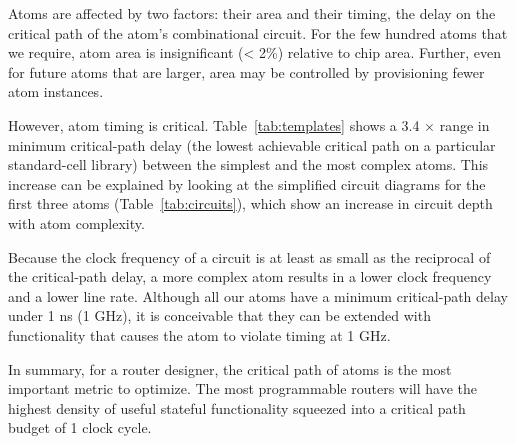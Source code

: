  Atoms are affected by
two factors: their area and their timing, \ie the delay on the critical path of
the atom's combinational circuit. For the few hundred atoms that we require,
atom area is insignificant (< 2\%) relative to chip area.  Further, even for
future atoms that are larger, area may be controlled by provisioning fewer atom
instances.

However, atom timing is critical. Table~\ref{tab:templates} shows a 3.4
$\times$ range in minimum critical-path delay (\ie the lowest achievable
critical path on a particular standard-cell library) between the simplest and
the most complex atoms.  This increase can be explained by looking at the
simplified circuit diagrams for the first three atoms
(Table~\ref{tab:circuits}), which show an increase in circuit depth with atom
complexity.

Because the clock frequency of a circuit is at least as small as the reciprocal
of the critical-path delay, a more complex atom results in a lower clock
frequency and a lower line rate. Although all our atoms have a minimum
critical-path delay under 1 ns (1 GHz), it is conceivable that they can be
extended with functionality that causes the atom to violate timing at 1 GHz.

In summary, for a router designer, the critical path of atoms is the most
important metric to optimize. The most programmable routers will have
the highest density of useful stateful functionality squeezed into a critical
path budget of 1 clock cycle.

